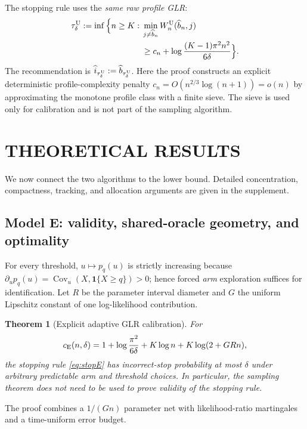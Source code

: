 \documentclass[twoside]{article}
\newtheorem{theorem}{Theorem}
\theoremstyle{definition}
\newcommand{\1}{\mathbf 1}
\begin{document}
The stopping rule uses the \emph{same raw profile GLR}:
\begin{equation}
\begin{split}
\tau_\delta^{\rm U}:=\inf\Big\{n\ge K:\;&\min_{j\ne \widehat b_n}
W_n^{\rm U}(\widehat b_n,j)\\
&\ge c_n+\log\frac{(K-1)\pi^2n^2}{6\delta}\Big\}.
\end{split}
\label{eq:stopU}
\end{equation}
The recommendation is
$\widehat i_{\tau_\delta^{\rm U}}:=\widehat b_{\tau_\delta^{\rm U}}$.
Here the proof constructs an explicit deterministic profile-complexity penalty $c_n=O(n^{2/3}\log(n+1))=o(n)$ by approximating the monotone profile class with a finite sieve.  The sieve is used only for calibration and is not part of the sampling algorithm.

\section{THEORETICAL RESULTS}
\label{sec:results}
We now connect the two algorithms to the lower bound.  Detailed concentration,
compactness, tracking, and allocation arguments are given in the supplement.

\subsection{Model E: validity, shared-oracle geometry, and optimality}
For every threshold, $u\mapsto p_q(u)$ is strictly increasing because
$\partial_u p_q(u)=\operatorname{Cov}_u(X,\1\{X\ge q\})>0$; hence forced
\emph{arm} exploration suffices for identification.  Let $R$ be the parameter
interval diameter and $G$ the uniform Lipschitz constant of one log-likelihood
contribution.
\begin{theorem}[Explicit adaptive GLR calibration]
\label{thm:Ecal}
For
\begin{equation}
c_{\rm E}(n,\delta)=1+\log\frac{\pi^2}{6\delta}+K\log n+K\log(2+GRn),
\label{eq:Eboundary}
\end{equation}
the stopping rule \eqref{eq:stopE} has incorrect-stop probability at most $\delta$ under arbitrary predictable arm and threshold choices.  In particular, the sampling theorem does not need to be used to prove validity of the stopping rule.
\end{theorem}
The proof combines a $1/(Gn)$ parameter net with likelihood-ratio martingales
and a time-uniform error budget.
\end{document}
